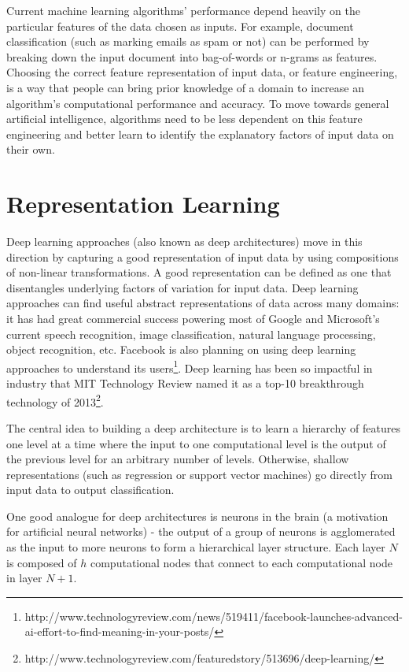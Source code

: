 Current machine learning algorithms' performance depend heavily on the particular features of the data chosen as inputs. For example, document classification (such as marking emails as spam or not) can be performed by breaking down the input document into bag-of-words or n-grams as features. Choosing the correct feature representation of input data, or feature engineering, is a way that people can bring prior knowledge of a domain to increase an algorithm's computational performance and accuracy. To move towards general artificial intelligence, algorithms need to be less dependent on this feature engineering and better learn to identify the explanatory factors of input data on their own\cite{bengio12}.

\section{Representation Learning}
Deep learning approaches (also known as deep architectures) move in this direction by capturing a good representation of input data by using compositions of non-linear transformations. A good representation can be defined as one that disentangles underlying factors of variation for input data\cite{bengio13}. Deep learning approaches can find useful abstract representations of data across many domains: it has had great commercial success powering most of Google and Microsoft's current speech recognition, image classification, natural language processing, object recognition, etc. Facebook is also planning on using deep learning approaches to understand its users\footnote{http://www.technologyreview.com/news/519411/facebook-launches-advanced-ai-effort-to-find-meaning-in-your-posts/}. Deep learning has been so impactful in industry that MIT Technology Review named it as a top-10 breakthrough technology of 2013\footnote{http://www.technologyreview.com/featuredstory/513696/deep-learning/}.

The central idea to building a deep architecture is to learn a hierarchy of features one level at a time where the input to one computational level is the output of the previous level for an arbitrary number of levels. Otherwise, shallow representations (such as regression or support vector machines) go directly from input data to output classification.

One good analogue for deep architectures is neurons in the brain (a motivation for artificial neural networks) - the output of a group of neurons is agglomerated as the input to more neurons to form a hierarchical layer structure. Each layer \(N\) is composed of \(h\) computational nodes that connect to each computational node in layer \(N+1\).

